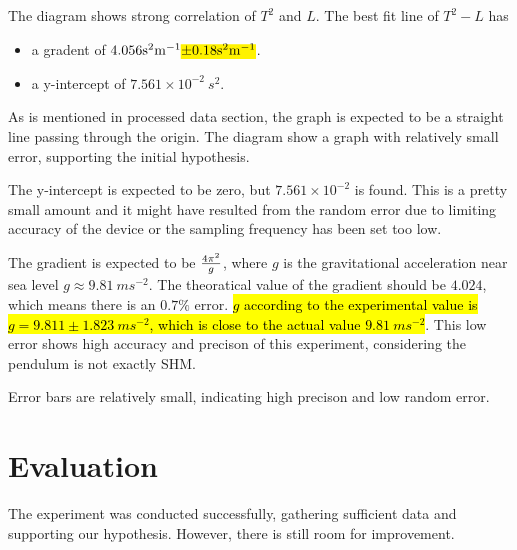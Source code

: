 \documentclass[a4paper]{article}
\begin{document}
The diagram shows strong correlation of $T^2$ and $L$. The best fit line of $T^2 - L$ has 

\begin{itemize}
    \item a gradent of $4.056 \SI{}{s^2m^{-1}} \text{\hl{$ \pm 0.18 \SI{}{s^2m^{-1}}$}}$.
    \item a y-intercept of $7.561\times 10^{-2} \SI{}{s^2}$.
\end{itemize}

As is mentioned in processed data section, the graph is expected to be a straight line passing through the origin. The diagram show a graph with relatively small error, supporting the initial hypothesis. 

The y-intercept is expected to be zero, but $7.561\times 10^{-2}$ is found. This is a pretty small amount and it might have resulted from the random error due to limiting accuracy of the device or the sampling frequency has been set too low.

The gradient is expected to be $4\pi^2 \over g$, where $g$ is the gravitational acceleration near sea level $g\approx \SI{9.81}{ms^{-2}}$. The theoratical value of the gradient should be $4.024$, which means there is an $0.7\%$ error. \hl{$g$ according to the experimental value is $g=9.811\pm 1.823\SI{}{ms^{-2}}$, which is close to the actual value $\SI{9.81}{ms^{-2}}$}. This low error shows high accuracy and precison of this experiment, considering the pendulum is not exactly SHM.

Error bars are relatively small, indicating high precison and low random error. 


\section{Evaluation}

The experiment was conducted successfully, gathering sufficient data and supporting our hypothesis. However, there is still room for improvement. 
\end{document}
